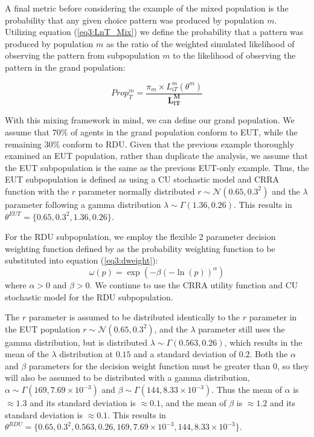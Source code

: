 \documentclass[../main.tex]{subfiles}
\begin{document}
A final metric before considering the example of the mixed population is the probability that any given choice pattern was produced by population $m$.
Utilizing equation (\ref{eq3:LnT_Mix}) we define the probability that a pattern was produced by population $m$ as the ratio of the weighted simulated likelihood of observing the pattern from subpopulation $m$ to the likelihood of observing the pattern in the grand population:

\begin{equation}
	\label{eq3:Propm}
	\mathit{Prop^m_{T}} = \frac{\pi_m \times L_{iT}^m(\theta^m) }{\bm{L_{iT}^M}}
\end{equation}

With this mixing framework in mind, we can define our grand population.
We assume that $70\%$ of agents in the grand population conform to EUT, while the remaining $30\%$ conform to RDU.
Given that the previous example thoroughly examined an EUT population, rather than duplicate the analysis, we assume that the EUT subpopulation is the same as the previous EUT-only example.
Thus, the EUT subpopulation is defined as using a CU stochastic model and CRRA function with the $r$ parameter normally distributed $r \sim \mathcal{N}(0.65 , 0.3^2 )$ and the $\lambda$ parameter following a gamma distribution $\lambda \sim \Gamma(1.36 , 0.26)$.
This results in $\theta^{EUT} = \lbrace 0.65 ,0.3^2, 1.36 , 0.26\rbrace$.

For the RDU subpopulation, we employ the flexible 2 parameter decision weighting function defined by \textcite{Prelec1998} as the probability weighting function to be substituted into equation (\ref{eq3:dweight}):
\begin{equation}
	\label{eq3:pw:pre}
	\omega(p)=\exp(-\beta(-\ln(p))^\alpha)
\end{equation}
\noindent where $\alpha > 0$ and $\beta > 0$.
We continue to use the CRRA utility function and CU stochastic model for the RDU subpopulation.

The $r$ parameter is assumed to be distributed identically to the $r$ parameter in the EUT population $r \sim \mathcal{N}(0.65 , 0.3^2 )$, and the $\lambda$ parameter still uses the gamma distribution, but is distributed $\lambda \sim \Gamma(0.563 , 0.26)$, which results in the mean of the $\lambda$ distribution at $0.15$ and a standard deviation of $0.2$.{\footnotemark}
Both the $\alpha$ and $\beta$ parameters for the decision weight function must be greater than $0$, so they will also be assumed to be distributed with a gamma distribution, $\alpha \sim \Gamma(169 , 7.69 \times 10^{-3})$ and $\beta \sim \Gamma(144 , 8.33 \times 10^{-3})$.
Thus the mean of $\alpha$ is $\approx 1.3$ and its standard deviation is $\approx 0.1$, and the mean of $\beta$ is $\approx 1.2$ and its standard deviation is $\approx 0.1$.
This results in $\theta^{RDU} = \lbrace  0.65 ,0.3^2,  0.563 , 0.26 , 169 , 7.69 \times 10^{-3} , 144 , 8.33 \times 10^{-3} \rbrace$.
\end{document}
